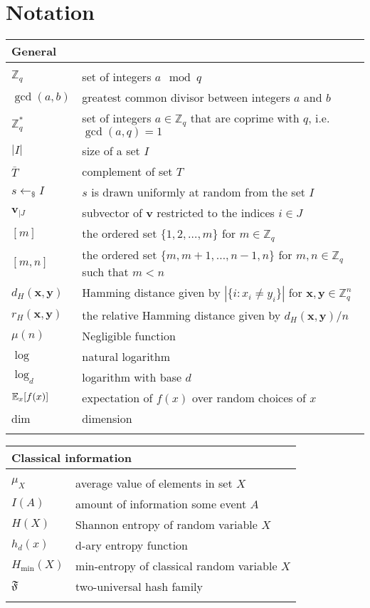 \chapter*{Notation}


\newcommand{\tabstart}[1]{\noindent \begin{tabular}{p{2.95cm}p{8.7cm}}
    \multicolumn{2}{l}{{\bf #1}} \\ \hline \\[-2.5ex] } 

\newcommand{\tabstop}{\\ \hline \end{tabular}}

\newcommand{\tabinter}{\vspace{1ex}}

\tabstart{General}
$\mathbb{Z}_q$ & set of integers $a \mod q$\\
$\gcd (a,b)$ & greatest common divisor between integers $a$ and $b$ \\
$\mathbb{Z}^*_q$ & set of integers $a\in\mathbb{Z}_q$ that are coprime with $q$, i.e. $\gcd (a,q) = 1$ \\
$|I|$ & size of a set $I$ \\
$\bar{T}$ & complement of set $T$ \\
$s\leftarrow_{\$}I$ & $s$ is drawn uniformly at random from the set $I$ \\
$\bm{v}_{|J}$ & subvector of $\bm{v}$ restricted to the indices $i \in J$ \\
$[m]$ & the ordered set $\{1, 2, \ldots, m\}$ for $m\in \mathbb{Z}_q$ \\
$[m, n]$ & the ordered set $\{m, m+1, \dots, n-1, n\}$ for $m, n\in \mathbb{Z}_q$ such that $m<n$ \\
$d_H(\bm{x}, \bm{y})$ & Hamming distance given by $ |\{ i : x_i \neq y_i \}|$ for $\bm{x},\bm{y}\in\mathbb{Z}^n_q$ \\
$r_H(\bm{x}, \bm{y})$ & the relative Hamming distance given by $d_H(\bm{x}, \bm{y})/n$ \\
$\mu(n)$ & Negligible function \\
  $\log$ & natural logarithm  \\
 $\log_d$ & logarithm with base $d$ \\
  $\operatorname*{\mathbb{E}}_{x}[f(x)]$ & expectation of $f(x)$ over random choices of $x$ \\
  dim & dimension \\
\tabstop

\tabinter

\tabstart{Classical information}
$\mu_X$ & average value of elements in set $X$\\
$I(A)$ & amount of information some event $A$ \\
$H(X)$ & Shannon entropy of random variable $X$\\
$h_d(x)$ & d-ary entropy function \\
$H_{\min}(X)$ & min-entropy of classical random variable $X$ \\
$\mathfrak{F}$ & two-universal hash family \\
\tabstop

